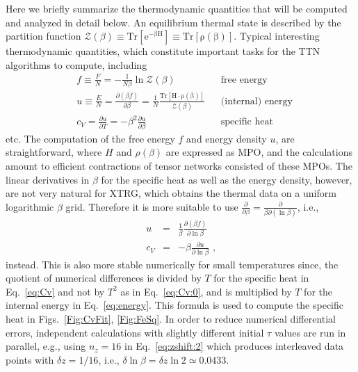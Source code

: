 \documentclass[aps,prx,twocolumn,showpacs,psfig,superscriptaddress,longbibliography]{revtex4-1}
\newcommand{\Tr}[1]{\mathrm{Tr\left[#1\right]}}
\newcommand{\Eq}[1]{Eq.~\eqref{#1}}
\begin{document}
 {Here we briefly summarize the thermodynamic quantities
that will be computed and analyzed in detail below.}
An equilibrium thermal state is described by the partition function
$\mathcal{Z}(\beta) \equiv \Tr{e^{-\beta H}} \equiv
\Tr{\rho(\beta)}$.  Typical interesting thermodynamic quantities,
which constitute important tasks for the TTN algorithms to compute,
including
%
\begin{subequations}
\label{Eq:ThermalQuan}
\begin{align}
& f \equiv{\tfrac{F}{N}} = -\tfrac{1}{N \beta} \ln \mathcal{Z}(\beta)
&\! &\text{free energy} \\
& u \equiv{\tfrac{E}{N}} 
  = \tfrac{\partial (\beta f)}{\partial \beta}
= \tfrac{1}{N} \tfrac{\Tr{H\cdot \rho(\beta)}}{\mathcal{Z}(\beta)}
&\!  &\text{(internal) energy}
\label{eq:energy:0}
 \\
& c_V =   
  \tfrac{\partial u}{\partial T}
 =  - \beta^2 \tfrac{\partial u}{\partial \beta}
&\! &\text{specific heat}
\label{eq:Cv:0}
\end{align}
\end{subequations}
%
etc. The computation of  {the} free energy $f$ and energy density $u$, are
straightforward, where $H$ and $\rho(\beta)$ are expressed as MPO,
and the calculations amount to efficient contractions of tensor
networks consisted of these MPOs.  The linear derivatives in $\beta$
for the specific heat as well as the energy density, however, are
not very natural for XTRG, which obtains the thermal data on a
uniform logarithmic $\beta$ grid.  Therefore it is more suitable to
use $\tfrac{\partial}{\partial\beta} =
\tfrac{\partial}{\beta\partial(\ln\beta)}$, i.e.,
%
\begin{subequations}
\label{Eq:ThermalQuan:X}
\begin{eqnarray}
u &=& \tfrac{1}{\beta} \tfrac{\partial (\beta f)}{\partial \ln{\beta}}
\label{eq:energy}
\\
c_V &=& -\beta\tfrac{\partial u}{\partial \ln\beta}
\text{ ,}\label{eq:Cv}
\end{eqnarray}
\end{subequations}
%
instead. This is also more stable numerically for small temperatures
since, the quotient of numerical differences is divided by $T$ for
the specific heat in \Eq{eq:Cv} and not by $T^2$ as in \Eq{eq:Cv:0},
and is multiplied by $T$ for the internal energy in \Eq{eq:energy}.
This formula is used to compute the specific heat in
Figs.~\ref{Fig:CvFit}, \ref{Fig:FeSq}.  In order to reduce numerical
differential errors, independent calculations with slightly
different initial $\tau$ values are run in parallel, e.g., using
$n_z=16$ in \Eq{eq:zshift:2} which produces interleaved data points
with $\delta z = 1/16$, i.e., $\delta \ln{\beta} =\delta z \ln 2
\simeq 0.0433$.
\end{document}
